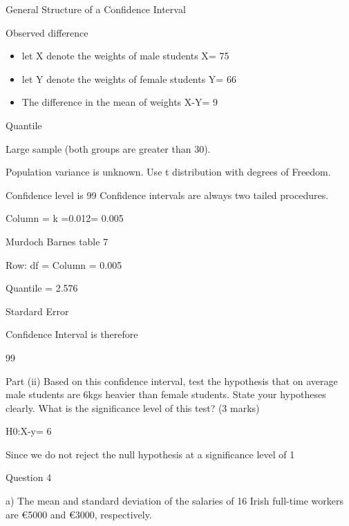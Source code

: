 \documentclass[12pt]{report}
\begin{document}
General Structure of a Confidence Interval





Observed difference

\begin{itemize}
\item let X denote the weights of male students    X= 75
\item let Y denote the weights of female students  Y= 66
\item The difference in the mean of weights X-Y= 9
\end{itemize}


Quantile

Large sample (both groups are greater than 30).

Population variance is unknown.
Use t distribution with  degrees of Freedom.


Confidence level is 99%
Confidence intervals are always two tailed procedures.


Column = k =0.012= 0.005


Murdoch Barnes table 7


Row: df =  
Column = 0.005

Quantile =  2.576 


Stardard Error






Confidence Interval is therefore

99%


Part (ii)
Based on this confidence interval, test the hypothesis that on average male students are 6kgs heavier than female students.
State your hypotheses clearly. What is the significance level of this test?   (3 marks)

H0:X-y= 6




Since  we do not reject the null hypothesis at a significance level of 1%






Question 4

a) The mean and standard deviation of the salaries of 16 Irish full-time workers are €5000  and €3000, respectively.
\end{document}
